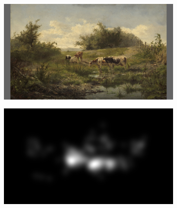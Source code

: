 \begin{figure}[ht]
    \centering
    \begin{subfigure}{0.24\textwidth}
        \includegraphics[width=\linewidth]{datas/predictions/stimulus_cows_at_a_pond_Bilders_1856.jpg}
        \caption{}
    \end{subfigure}
    \begin{subfigure}{0.24\textwidth}
        \includegraphics[width=\linewidth]{datas/predictions/human_cows_at_a_pond_Bilders_1856.jpg}
        \caption{}
    \end{subfigure}


\end{figure}
